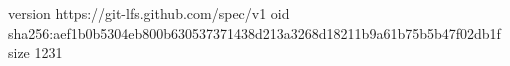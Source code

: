 version https://git-lfs.github.com/spec/v1
oid sha256:aef1b0b5304eb800b630537371438d213a3268d18211b9a61b75b5b47f02db1f
size 1231
